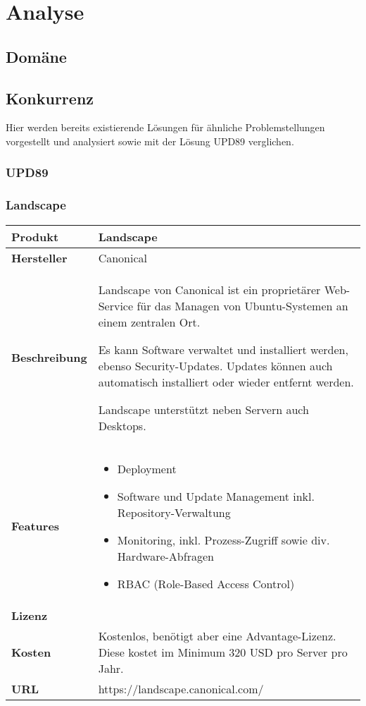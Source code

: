 \chapter{Analyse}

\section{Domäne}

\section{Konkurrenz} \label{sec:analysis:competition}

Hier werden bereits existierende Lösungen für ähnliche Problemstellungen vorgestellt und analysiert sowie mit der Lösung \gls{UPD89} verglichen.

\subsection{UPD89}

\newcommand{\competitor}[7]{
	\begin{tabularx}{\linewidth}{lX}
		\toprule
		\textbf{Produkt} & #1\\
		\midrule
		\textbf{Hersteller} & #2\\
		\textbf{Beschreibung} & #3\\
		\textbf{Features} & #4\\
    \textbf{Lizenz} & #5\\
		\textbf{Kosten} & #6\\
    \textbf{URL} & #7\\
		\bottomrule
	\end{tabularx}
}

\subsection{Landscape}

\competitor{Landscape}
{Canonical}
{Landscape von Canonical ist ein proprietärer Web-Service für das Managen von Ubuntu-Systemen an einem zentralen Ort.

Es kann Software verwaltet und installiert werden, ebenso Security-Updates. Updates können auch automatisch installiert oder wieder entfernt werden.

Landscape unterstützt neben Servern auch Desktops.}
{\begin{itemize}
\item Deployment
\item Software und Update Management inkl. Repository-Verwaltung
\item Monitoring, inkl. Prozess-Zugriff sowie div. Hardware-Abfragen
\item RBAC (Role-Based Access Control)
\end{itemize}}
{}
{Kostenlos, benötigt aber eine Advantage-Lizenz. Diese kostet im Minimum 320 USD pro Server pro Jahr.}
{https://landscape.canonical.com/}

